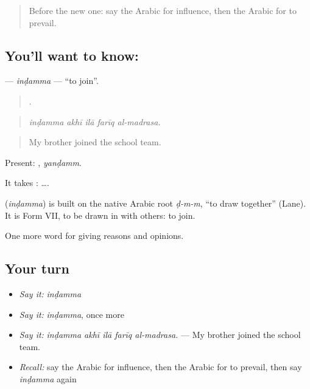 \label{lesson:AR-C389-indamma}



\begin{quote}
Before the new one: say the Arabic for influence, then the Arabic for to prevail.
\end{quote}

\subsection*{You'll want to know: }
\textbf{} — \emph{inḍamma} — \textquotedblleft{}to join\textquotedblright{}.

\begin{quote}
    .
\end{quote}

\begin{quote}
\emph{inḍamma akhī ilā farīq al-madrasa.}
\end{quote}

\begin{quote}
My brother joined the school team.
\end{quote}

Present: , \emph{yanḍamm}.

It takes :   ….

\begin{cousinweb}
\textbf{} (\emph{inḍamma}) is built on the native Arabic root \emph{ḍ-m-m}, \textquotedblleft{}to draw together\textquotedblright{} (Lane). It is Form VII, to be drawn in with others: to join.
\end{cousinweb}

\begin{grammarlens}[title={What you've built}]
One more word for giving reasons and opinions.
\end{grammarlens}

\subsection*{Your turn}
\begin{itemize}
\raggedright
  \item \emph{Say it:} \emph{inḍamma}
  \item \emph{Say it:} \emph{inḍamma}, once more
  \item \emph{Say it:} \emph{inḍamma akhī ilā farīq al-madrasa.} — My brother joined the school team.
  \item \emph{Recall:} say the Arabic for influence, then the Arabic for to prevail, then say \emph{inḍamma} again
\end{itemize}

